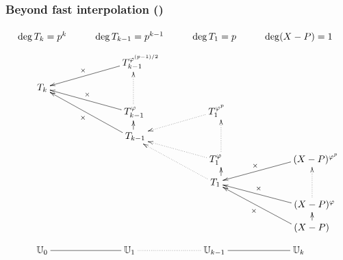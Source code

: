 \documentclass[10pt]{beamer}
\newcommand{\U}{\mathbb{U}}  %
\newcommand{\frob}{\varphi}  %
\newcommand{\0}{\mathcal{O}}  %
\begin{document}
\begin{frame}
  \frametitle{Beyond fast interpolation (\cite{DF07})}
  
  \footnotesize
  \[\xymatrix@R=8pt{
    \deg T_k=p^k & \deg T_{k-1} = p^{k-1} & \deg T_1 = p & \deg (X - P) = 1
    \\
    & **[r]T_{k-1}^{\frob^{(p-1)/2}}\ar[dl]_-\times \\
    T_k &  \\
    & **[r]T_{k-1}^{\frob}\ar[ul]_-\times \ar@<-4pt>@{.>}[uu] & **[r]T_1^{\frob^p}\ar@{.>}[dl]\\
    & **[r]T_{k-1}\ar[uul]^-\times \ar@<-4pt>[u] & \\
    & & **[r]T_1^{\frob}\ar@{.>}[ul] \ar@<-7pt>@{.>}[uu] & **[r](X-P)^{\frob^p}\ar[dl]_-\times \\
    & & **[r]T_1\ar@{.>}[uul] \ar@<-7pt>[u] &  \\
    & & & **[r](X-P)^{\frob}\ar[ul]_-\times \ar@<-14pt>@{.>}[uu] \\
    & & & **[r](X-P)\ar[uul]^-\times \ar@<-14pt>[u]
    \\
      {\U_0 \ar@{-}[r]} & {\U_1 \ar@{.}[r]} &
      {\U_{k-1} \ar@{-}[r]} & {\U_k}
  }\]
\end{frame}

\end{document}
